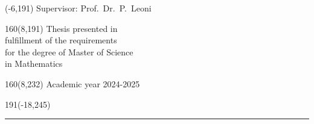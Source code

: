 %
\begin{textblock}{70}(-6,191)
\textblockcolour{}
\vspace{-\parskip}
\flushleft
Supervisor: Prof.~Dr.~P.~Leoni\\[-2pt]
\end{textblock}
%
\begin{textblock}{160}(8,191)
\textblockcolour{}
\vspace{-\parskip}
\flushright
Thesis presented in\\[4.5pt]
fulfillment of the requirements\\[4.5pt]
for the degree of Master of Science\\[4.5pt]
in Mathematics\\
\end{textblock}
%
\begin{textblock}{160}(8,232)
\textblockcolour{}
\vspace{-\parskip}
\flushright
Academic year 2024-2025
\end{textblock}
%
\begin{textblock}{191}(-18,245)
{\color{blueline}\rule{550pt}{5.5pt}}
\end{textblock}
%
\vfill
\newpage
